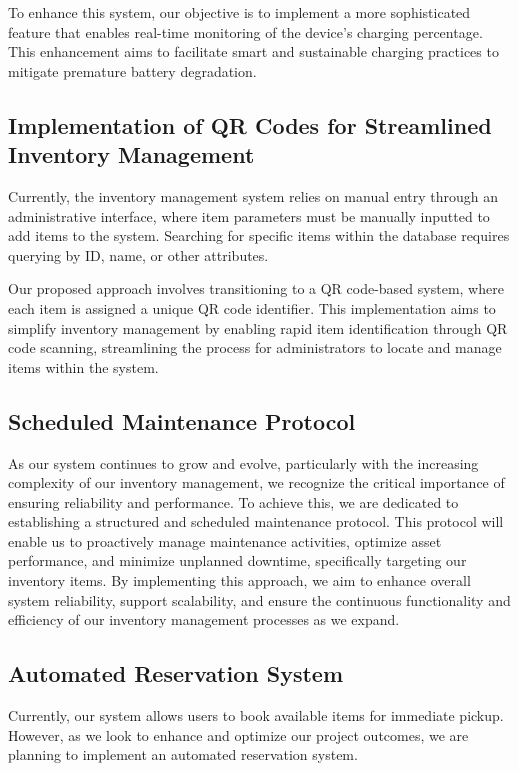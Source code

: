 To enhance this system, our objective is to implement a more sophisticated feature that enables 
real-time monitoring of the device's charging percentage. This enhancement aims to facilitate smart and 
sustainable charging practices to mitigate premature battery degradation.


\subsection{Implementation of QR Codes for Streamlined Inventory Management}
Currently, the inventory management system relies on manual entry through an administrative interface,
 where item parameters must be manually inputted to add items to the system. 
 Searching for specific items within the database requires querying by ID, name, or other attributes.

Our proposed approach involves transitioning to a QR code-based system, where each item is assigned
 a unique QR code identifier. 
 This implementation aims to simplify inventory management by enabling rapid item identification 
 through QR code scanning, streamlining the process for administrators to locate and manage items
 within the system.

\subsection{Scheduled Maintenance Protocol}
As our system continues to grow and evolve, particularly with the increasing complexity of our inventory management,
we recognize the critical importance of ensuring reliability and performance. 
To achieve this, we are dedicated to establishing a structured and scheduled maintenance protocol. 
This protocol will enable us to proactively manage maintenance activities, optimize asset performance,
and minimize unplanned downtime, specifically targeting our inventory items. By implementing this approach,
we aim to enhance overall system reliability, support scalability,
and ensure the continuous functionality and efficiency of our inventory management processes as we expand.


\subsection{Automated Reservation System}

Currently, our system allows users to book available items for immediate pickup. However, as we look to enhance and optimize our project outcomes, we are planning to implement an automated reservation system.

